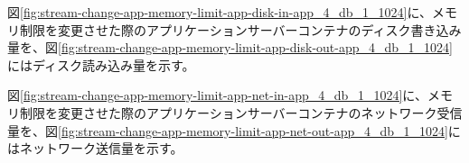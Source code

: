 \documentclass[../../../../main]{subfiles}
\begin{document}

    図\ref{fig:stream-change-app-memory-limit-app-disk-in-app_4_db_1_1024}に、メモリ制限を変更させた際のアプリケーションサーバーコンテナのディスク書き込み量を、図\ref{fig:stream-change-app-memory-limit-app-disk-out-app_4_db_1_1024}にはディスク読み込み量を示す。

    
    


    図\ref{fig:stream-change-app-memory-limit-app-net-in-app_4_db_1_1024}に、メモリ制限を変更させた際のアプリケーションサーバーコンテナのネットワーク受信量を、図\ref{fig:stream-change-app-memory-limit-app-net-out-app_4_db_1_1024}にはネットワーク送信量を示す。

    
    
\end{document}
